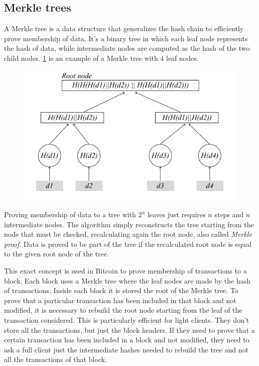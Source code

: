 \subsection{Merkle trees}

A Merkle tree is a data structure that generalizes the hash chain to efficiently prove membership of data. It's a binary tree in which each leaf node represents the hash of data, while intermediate nodes are computed as the hash of the two child nodes. \cref{fig:merkle-tree} is an example of a Merkle tree with 4 leaf nodes.

\begin{figure}[H]
  \centering
  \includegraphics[width=1\textwidth]{Figures/background/merkle_tree.jpg}
  \caption[Merkle tree]{}
  \label{fig:merkle-tree}
\end{figure}

Proving membership of data to a tree with $2^n$ leaves just requires $n$ steps and $n$ intermediate nodes. The algorithm simply reconstructs the tree starting from the node that must be checked, recalculating again the root node, also called \textit{Merkle proof}. Data is proved to be part of the tree if the recalculated root node is equal to the given root node of the tree.

This exact concept is used in Bitcoin to prove membership of transactions to a block. Each block uses a Merkle tree where the leaf nodes are made by the hash of transactions. Inside each block it is stored the root of the Merkle tree. To prove that a particular transaction has been included in that block and not modified, it is necessary to rebuild the root node starting from the leaf of the transaction considered. This is particularly efficient for light clients. They don't store all the transactions, but just the block headers. If they need to prove that a certain transaction has been included in a block and not modified, they need to ask a full client just the intermediate hashes needed to rebuild the tree and not all the transactions of that block.

